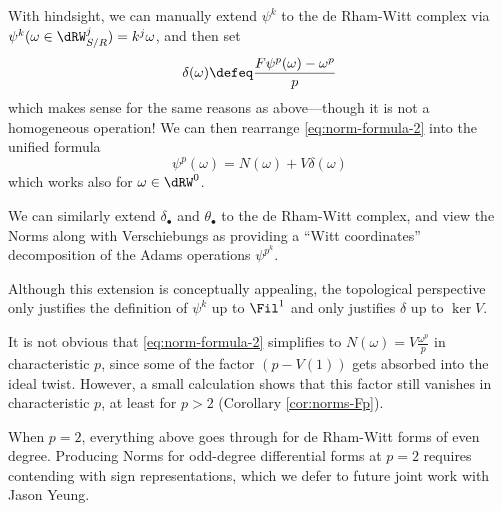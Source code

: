 With hindsight, we can manually extend $\psi^k$ to the de Rham-Witt complex via $\psi^k(\omega\in\dRW^j_{S/R}) = k^j\omega$, and then set
\[ \delta(\omega) \defeq \frac{F\psi^p(\omega) - \omega^p}p \]
which makes sense for the same reasons as above---though it is not a homogeneous operation! We can then rearrange \eqref{eq:norm-formula-2} into the unified formula
\[ \psi^p(\omega) = N(\omega) + V\delta(\omega) \]
which works also for $\omega\in\dRW^0$.

We can similarly extend $\delta_\bullet$ and $\theta_\bullet$ to the de Rham-Witt complex, and view the Norms along with Verschiebungs as providing a ``Witt coordinates'' decomposition of the Adams operations $\psi^{p^k}$.

\begin{warning}
Although this extension is conceptually appealing, the topological perspective only justifies the definition of $\psi^k$ up to $\Fil^1$ and only justifies $\delta$ up to $\ker V$.
\end{warning}

\begin{warning}
  It is not obvious that \eqref{eq:norm-formula-2} simplifies to $N(\omega)=V\frac{\omega^p}p$ in characteristic $p$, since some of the factor $(p-V(1))$ gets absorbed into the ideal twist. However, a small calculation shows that this factor still vanishes in characteristic $p$, at least for $p>2$ (Corollary \ref{cor:norms-Fp}).
\end{warning}

\begin{remark}
  \label{rmk:norms-2}
  When $p=2$, everything above goes through for de Rham-Witt forms of even degree. Producing Norms for odd-degree differential forms at $p=2$ requires contending with sign representations, which we defer to future joint work with Jason Yeung.
\end{remark}

